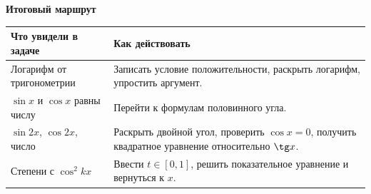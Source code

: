 \documentclass[a4paper,12pt]{article}
\newcommand{\sub}[1]{\vspace{.45em}\noindent\textcolor{darkaccent}{\bfseries #1}\par\smallskip}
\begin{document}
\vspace{12mm}
\sub{Итоговый маршрут}
\begin{tabularx}{\linewidth}{@{}p{55mm}X@{}}
\toprule
\textbf{Что увидели в задаче} & \textbf{Как действовать} \\
\midrule
Логарифм от тригонометрии & Записать условие положительности, раскрыть логарифм, упростить аргумент. \\
$\sin x$ и $\cos x$ равны числу & Перейти к формулам половинного угла. \\
$\sin2x$, $\cos2x$, число & Раскрыть двойной угол, проверить $\cos x=0$, получить квадратное уравнение относительно $\tg x$. \\
Степени с $\cos^2kx$ & Ввести $t\in[0,1]$, решить показательное уравнение и вернуться к $x$. \\
\bottomrule
\end{tabularx}
\end{document}
